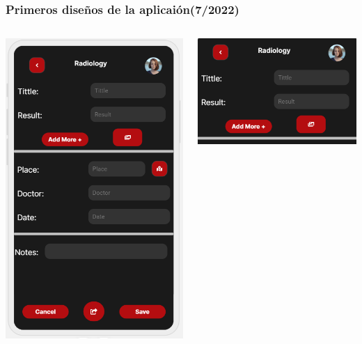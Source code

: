 \documentclass[14pt]{beamer}
\begin{document}
\begin{frame}
\frametitle{Primeros diseños de la aplicaión(7/2022)}


\begin{columns}
\begin{column}{0.5\textwidth}
\begin{center}

\includegraphics[scale = 0.35]{Images/photoExample.png}

\end{center}
\end{column}
\begin{column}{0.5\textwidth}
\begin{center}

\includegraphics[scale = 0.55]{Images/photoExampleZoom.png}


\end{center}
\end{column}
\end{columns}
\end{frame}
\end{document}
